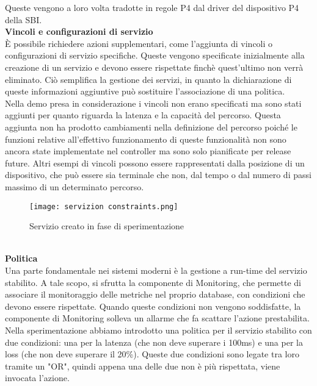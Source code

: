 Queste vengono a loro volta tradotte in regole P4 dal driver del dispositivo P4 della SBI.
\\\textbf{Vincoli e configurazioni di servizio}
\\È possibile richiedere azioni supplementari, come l'aggiunta di vincoli o configurazioni di servizio specifiche. 
Queste vengono specificate inizialmente alla creazione di un servizio e devono essere rispettate finchè quest'ultimo non verrà eliminato. 
Ciò semplifica la gestione dei servizi, in quanto la dichiarazione di queste informazioni aggiuntive può sostituire l'associazione di una politica.
\\Nella demo presa in considerazione i vincoli non erano specificati ma sono stati aggiunti per quanto riguarda la latenza e la capacità del percorso.
Questa aggiunta non ha prodotto cambiamenti nella definizione del percorso poiché le funzioni relative all'effettivo funzionamento di queste funzionalità non 
sono ancora state implementate nel controller ma sono solo pianificate per release future.
Altri esempi di vincoli possono essere rappresentati dalla posizione di un dispositivo, che può essere sia terminale che non, dal tempo o dal numero di passi massimo di un determinato percorso.
\begin{figure}[h]
    \centering
   \texttt{[image: servizion constraints.png]}
    \caption{Servizio creato in fase di sperimentazione}
    \label{fig:constraints}
\end{figure}
\\\textbf{Politica}
\\Una parte fondamentale nei sistemi moderni è la gestione a run-time del servizio stabilito.
A tale scopo, si sfrutta la componente di Monitoring, che permette di associare il monitoraggio delle metriche nel proprio database,
con condizioni che devono essere rispettate.
Quando queste condizioni non vengono soddisfatte, la componente di Monitoring solleva un allarme che fa scattare l'azione prestabilita.
\\Nella sperimentazione abbiamo introdotto una politica per il servizio stabilito con due condizioni: una per la latenza (che non deve superare i 100ms) e una per la loss (che non deve superare il 20\%).
Queste due condizioni sono legate tra loro tramite un "OR", quindi appena una delle due non è più rispettata, viene invocata l'azione.
